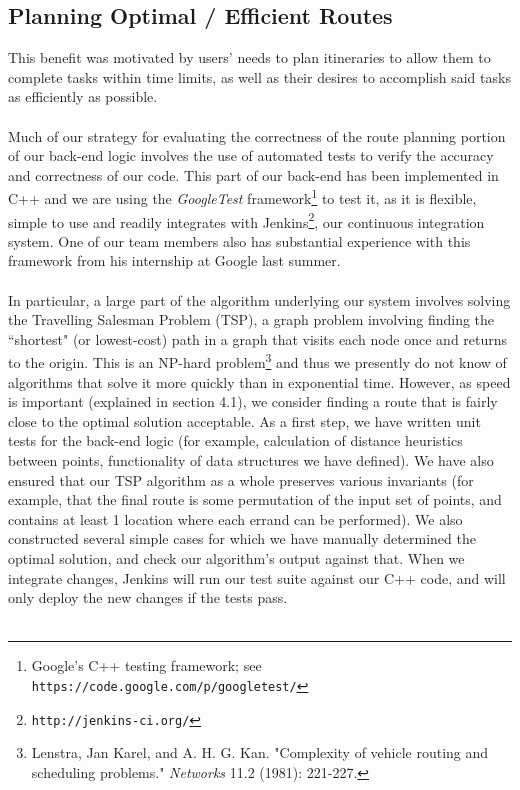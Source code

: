 \documentclass[a4paper, 10pt]{article}
\begin{document}
\subsection{Planning Optimal / Efficient Routes}
This benefit was motivated by users' needs to plan itineraries to allow them to complete tasks within time limits, as well as their desires to accomplish said tasks as efficiently as possible.\\\\
Much of our strategy for evaluating the correctness of the route planning portion of our back-end logic involves the use of automated tests to verify the accuracy and correctness of our code. This part of our back-end has been implemented in C++ and we are using the \textit{GoogleTest} framework\footnote{Google's C++ testing framework; see \texttt{https://code.google.com/p/googletest/}} to test it, as it is flexible, simple to use and readily integrates with Jenkins\footnote{\texttt{http://jenkins-ci.org/}}, our continuous integration system. One of our team members also has substantial experience with this framework from his internship at Google last summer. \\\\
In particular, a large part of the algorithm underlying our system involves solving the Travelling Salesman Problem (TSP), a graph problem involving finding the ``shortest" (or lowest-cost) path in a graph that visits each node once and returns to the origin. This is an NP-hard problem\footnote{Lenstra, Jan Karel, and A. H. G. Kan. "Complexity of vehicle routing and scheduling problems." \textit{Networks} 11.2 (1981): 221-227.} and thus we presently do not know of algorithms that solve it more quickly than in exponential time. However, as speed is important (explained in section 4.1), we consider finding a route that is fairly close to the optimal solution acceptable. As a first step, we have written unit tests for the back-end logic (for example, calculation of distance heuristics between points, functionality of data structures we have defined). We have also ensured that our TSP algorithm as a whole preserves various invariants (for example, that the final route is some permutation of the input set of points, and contains at least 1 location where each errand can be performed). We also constructed several simple cases for which we have manually determined the optimal solution, and check our algorithm's output against that. When we integrate changes, Jenkins will run our test suite against our C++ code, and will only deploy the new changes if the tests pass. \\\\
\end{document}
